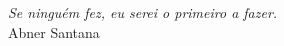 \begin{epigrafe}
  \vspace*{\fill}
  \begin{flushright}
    \textit
    {
      Se ninguém fez, eu serei o primeiro a fazer.  \\
    }\medskip %
    Abner Santana
  \end{flushright}
\end{epigrafe}
\newpage